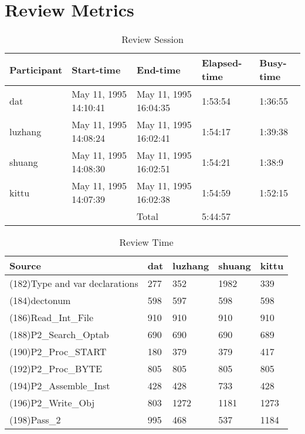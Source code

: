 \section{Review Metrics}
\begin{table}[hb]
\begin{center}
\begin{tabular}{|l|l|l|l|l|}
\hline
Participant & Start-time & End-time & Elapsed-time & Busy-time \\
\hline
dat & May 11, 1995 14:10:41 & May 11, 1995 16:04:35 & 1:53:54 & 1:36:55 \\
luzhang & May 11, 1995 14:08:24 & May 11, 1995 16:02:41 & 1:54:17 & 1:39:38 \\
shuang & May 11, 1995 14:08:30 & May 11, 1995 16:02:51 & 1:54:21 & 1:38:9 \\
kittu & May 11, 1995 14:07:39 & May 11, 1995 16:02:38 & 1:54:59 & 1:52:15 \\
\hline
 & & Total & 5:44:57 & \\
\hline
\end{tabular}
\end{center}
\caption{Review Session}
\end{table}


\begin{table}[hb]
\begin{center}
\begin{tabular}{|l|l|l|l|l|}
\hline
Source & dat & luzhang & shuang & kittu\\
\hline
(182)Type and var declarations & 277 & 352 & 1982 & 339\\
(184)dectonum & 598 & 597 & 598 & 598\\
(186)Read\_Int\_File & 910 & 910 & 910 & 910\\
(188)P2\_Search\_Optab & 690 & 690 & 690 & 689\\
(190)P2\_Proc\_START & 180 & 379 & 379 & 417\\
(192)P2\_Proc\_BYTE & 805 & 805 & 805 & 805\\
(194)P2\_Assemble\_Inst & 428 & 428 & 733 & 428\\
(196)P2\_Write\_Obj & 803 & 1272 & 1181 & 1273\\
(198)Pass\_2 & 995 & 468 & 537 & 1184\\
\hline
\end{tabular}
\end{center}
\caption{Review Time}
\end{table}

